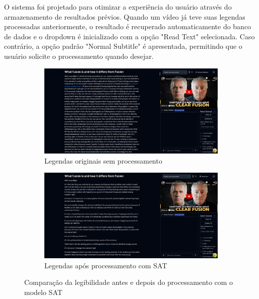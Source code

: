 \documentclass[tcc,capa]{texufpel}
\begin{document}
O sistema foi projetado para otimizar a experiência do usuário através do armazenamento de resultados prévios. Quando um vídeo já teve suas legendas processadas anteriormente, o resultado é recuperado automaticamente do banco de dados e o dropdown é inicializado com a opção "Read Text" selecionada. Caso contrário, a opção padrão "Normal Subtitle" é apresentada, permitindo que o usuário solicite o processamento quando desejar.

\begin{figure}[H]
  \centering
  \begin{subfigure}{0.49\textwidth}
    \includegraphics[width=\textwidth,height=0.35\textheight,keepaspectratio]{exemplo-slides/graphics/images/pre-improved-readability.png}
    \caption{Legendas originais sem processamento}
    \label{fig:before_readability}
  \end{subfigure}
  \hfill
  \begin{subfigure}{0.49\textwidth}
    \includegraphics[width=\textwidth,height=0.35\textheight,keepaspectratio]{exemplo-slides/graphics/images/after-improved-readability.png}
    \caption{Legendas após processamento com SAT}
    \label{fig:after_readability}
  \end{subfigure}
  \caption{Comparação da legibilidade antes e depois do processamento com o modelo SAT}
  \label{fig:readability_comparison}
\end{figure}
\end{document}
